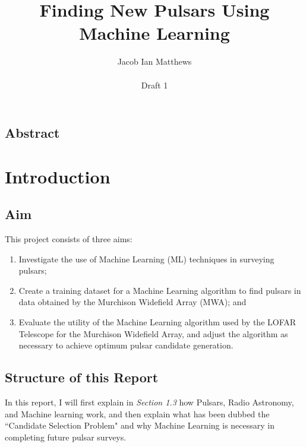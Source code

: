 \documentclass{article}
\title{Finding New Pulsars Using Machine Learning}
\author{Jacob Ian Matthews \\ \\ Draft 1}
\begin{document}
\begin{titlepage}
    
    \maketitle

    \section*{Abstract}

\end{titlepage}

\pagebreak

\tableofcontents

\pagebreak


\section{Introduction}

\subsection{Aim}

This project consists of three aims:
\begin{enumerate}[label=\roman*.]
    \item Investigate the use of Machine Learning (ML) techniques in surveying pulsars;
    \item Create a training dataset for a Machine Learning algorithm to find pulsars in data obtained by the Murchison Widefield Array (MWA); and
    \item Evaluate the utility of the Machine Learning algorithm used by the LOFAR Telescope for the Murchison Widefield Array, and adjust the algorithm as necessary to achieve optimum pulsar candidate generation.
\end{enumerate}

\subsection{Structure of this Report}

In this report, I will first explain in \emph{Section 1.3} how Pulsars, Radio Astronomy, and Machine learning work, and then explain what has been dubbed the ``Candidate Selection Problem" \autocite{lyon} and why Machine Learning is necessary in completing future pulsar surveys.
\end{document}
